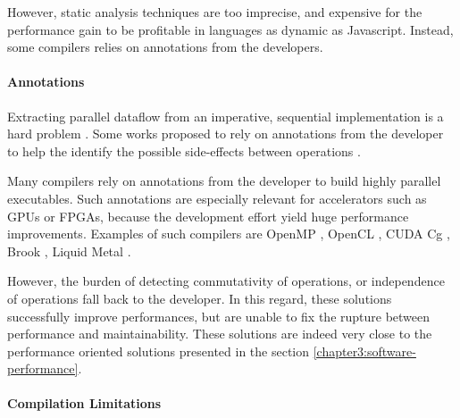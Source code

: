 However, static analysis techniques are too imprecise, and expensive for the performance gain to be profitable in languages as dynamic as Javascript.
Instead, some compilers relies on annotations from the developers.

\paragraph{Annotations}

Extracting parallel dataflow from an imperative, sequential implementation is a hard problem \cite{Johnston2004a}.
Some works proposed to rely on annotations from the developer to help the identify the possible side-effects between operations \cite{Vandierendonck2010a,Fernandez2014a}.

Many compilers rely on annotations from the developer to build highly parallel executables.
Such annotations are especially relevant for accelerators such as GPUs or FPGAs, because the development effort yield huge performance improvements.
Examples of such compilers are OpenMP \cite{Dagum1998}, OpenCL \cite{Stone2010}, CUDA \cite{Nvidia2007} Cg \cite{Mark2003}, Brook \cite{Buck2004}, Liquid Metal \cite{Huang2008}.


However, the burden of detecting commutativity of operations, or independence of operations fall back to the developer.
In this regard, these solutions successfully improve performances, but are unable to fix the rupture between performance and maintainability.
These solutions are indeed very close to the performance oriented solutions presented in the section \ref{chapter3:software-performance}.



\paragraph{Compilation Limitations}

